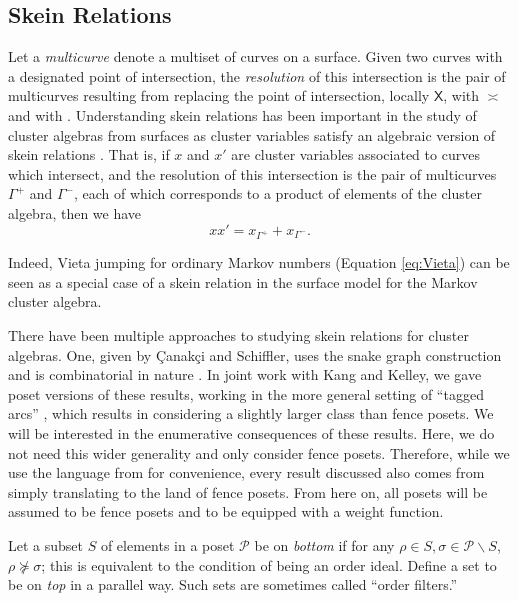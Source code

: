 \documentclass[12pt, letterpaper,table]{amsart}
\theoremstyle{remark}
\newcommand{\calP}{\mathcal{P}}
\newcommand{\canakci}{{\c{C}}anak{\c{c}}i }
\begin{document}
\subsection{Skein Relations}\label{sec:Skein}

Let a \emph{multicurve} denote a multiset of curves on a surface.
Given two curves with a designated point of intersection, the \emph{resolution} of this intersection is the pair of multicurves resulting from replacing the point of intersection, locally $\mathsf{X}$, with $\asymp$ and with . Understanding skein relations has been important in the study of cluster algebras from surfaces as cluster variables satisfy an algebraic version of skein relations \cite{FT-II}. That is, if $x$ and $x'$ are cluster variables associated to curves which intersect, and the resolution of this intersection is the pair of multicurves $\Gamma^+$ and $\Gamma^-$, each of which corresponds to a product of elements of the cluster algebra, then we have \[
xx' = x_{\Gamma^+} + x_{\Gamma^-}.
\]

Indeed, Vieta jumping for ordinary Markov numbers (Equation \ref{eq:Vieta}) can be seen as a special case of a skein relation in the surface model for the Markov cluster algebra.

There have been multiple approaches to studying skein relations for cluster algebras. One, given by \canakci and Schiffler, uses the snake graph construction and is combinatorial in nature \cite{CS13}. In joint work with Kang and Kelley, we gave poset versions of these results, working in the more general setting of ``tagged arcs'' \cite{banaian2024skein}, which results in considering a slightly larger class than fence posets. We will be interested in the enumerative consequences of these results. Here, we do not need this wider generality and only consider fence posets. Therefore, while we use the language from \cite{banaian2024skein} for convenience, every result discussed also comes from simply translating \cite{CS13} to the land of fence posets. From here on, all posets will be assumed to be fence posets and to be equipped with a weight function. 


Let a subset $S$ of elements in a poset $\calP$ be on \emph{bottom} if for any $\rho \in S, \sigma \in \calP \backslash S$, $\rho \not\succeq \sigma$; this is equivalent to the condition of being an order ideal. Define a set to be on \emph{top} in a parallel way. Such sets are sometimes called ``order filters.''
\end{document}
